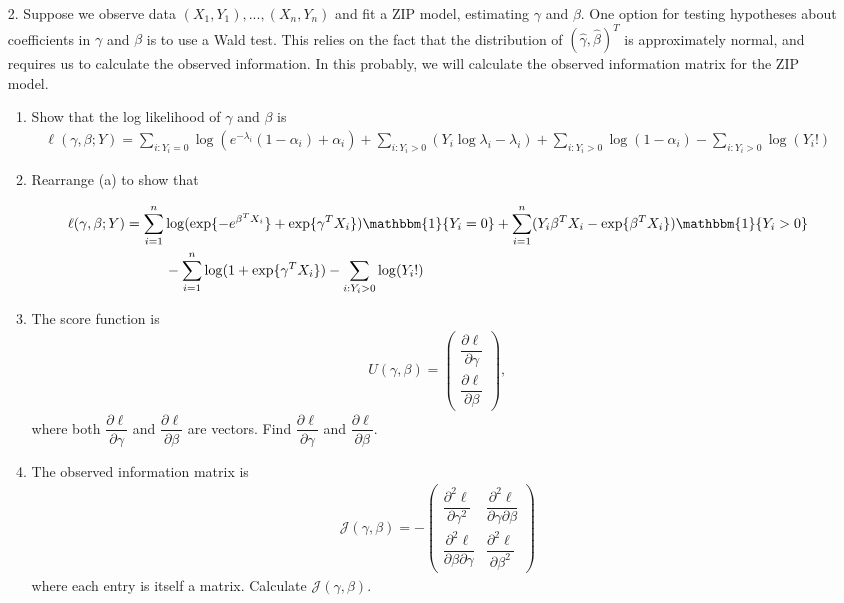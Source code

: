 \documentclass[11pt]{article}
\begin{document}
\begin{enumerate}
\item[2.] Suppose we observe data $(X_1,Y_1),...,(X_n,Y_n)$ and fit a ZIP model, estimating $\gamma$ and $\beta$. One option for testing hypotheses about coefficients in $\gamma$ and $\beta$ is to use a Wald test. This relies on the fact that the distribution of $(\widehat{\gamma}, \widehat{\beta})^T$ is approximately normal, and requires us to calculate the observed information. In this probably, we will calculate the observed information matrix for the ZIP model.

\begin{enumerate}
\item Show that the log likelihood of $\gamma$ and $\beta$ is
\begin{align*}
\ell(\gamma, \beta; Y) = \sum \limits_{i: Y_i = 0} \log \left( e^{-\lambda_i}(1 - \alpha_i) + \alpha_i \right) + \sum \limits_{i: Y_i > 0} (Y_i \log \lambda_i - \lambda_i) + \sum \limits_{i: Y_i > 0} \log(1 - \alpha_i) - \sum_{i: Y_i > 0} \log(Y_i!)
\end{align*}

\item Rearrange (a) to show that

\begin{align*}
\ell(\gamma, \beta; Y) &= \sum \limits_{i=1}^n \log( \exp\{ -e^{\beta^T X_i} \} + \exp\{\gamma^T X_i\}) \mathbbm{1}\{Y_i = 0\} + \sum \limits_{i=1}^n(Y_i \beta^T X_i - \exp\{ \beta^T X_i \}) \mathbbm{1}\{Y_i > 0\} \\
& \hspace{1cm} - \sum \limits_{i=1}^n \log(1 + \exp\{\gamma^T X_i\}) - \sum \limits_{i: Y_i > 0} \log(Y_i!)
\end{align*}

\item The score function is 
\renewcommand*{\arraystretch}{2}
\begin{align*}
U(\gamma, \beta) = \begin{pmatrix}
\dfrac{\partial \ell}{\partial \gamma} \\
\dfrac{\partial \ell}{\partial \beta}
\end{pmatrix},
\end{align*}
where both $\dfrac{\partial \ell}{\partial \gamma}$ and $\dfrac{\partial \ell}{\partial \beta}$ are vectors. Find $\dfrac{\partial \ell}{\partial \gamma}$ and $\dfrac{\partial \ell}{\partial \beta}$.

\item The observed information matrix is 
\renewcommand*{\arraystretch}{2}
\begin{align*}
\mathcal{J}(\gamma, \beta) = -\begin{pmatrix}
\dfrac{\partial^2 \ell}{\partial \gamma^2} & \dfrac{\partial^2 \ell}{\partial \gamma \partial \beta} \\[6pt]
\dfrac{\partial^2 \ell}{\partial \beta \partial \gamma} & \dfrac{\partial^2 \ell}{\partial \beta^2}
\end{pmatrix}
\end{align*}
where each entry is itself a matrix. Calculate $\mathcal{J}(\gamma, \beta)$.


\end{enumerate}
\end{enumerate}
\end{document}
